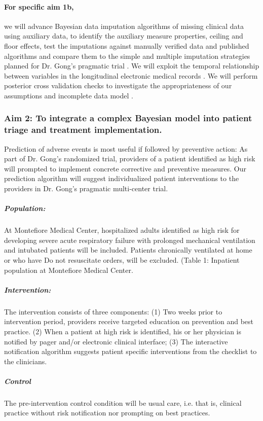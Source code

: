 \documentclass[11pt,notitlepage]{article}
\begin{document}
\paragraph*{For specific aim 1b,}
we will advance Bayesian data imputation algorithms of missing clinical data using auxiliary data, to identify the auxiliary measure properties, ceiling and floor effects, test the imputations against manually verified data and published algorithms and compare them to the simple and multiple imputation strategies planned for Dr. Gong's pragmatic trial \cite{Huntington_16311133,Sloan_15027501}. We will exploit the temporal relationship between variables in the longitudinal electronic medical records \cite{Welch24782349}. We will perform posterior cross validation checks to investigate the appropriateness of our assumptions and incomplete data model \cite{Gelman1998notasked}.


\subsubsection*{Aim 2: To integrate a complex Bayesian model into patient triage and treatment implementation.}
Prediction of adverse events is most useful if followed by preventive action: As part of Dr. Gong's randomized trial, providers of a patient identified as high risk will prompted to implement concrete corrective and preventive measures. Our prediction algorithm will suggest individualized patient interventions to the providers in Dr. Gong's pragmatic multi-center trial. 

\subparagraph*{Population:} 
At Montefiore Medical Center, hospitalized adults identified as high risk for developing severe acute respiratory failure with prolonged mechanical ventilation and intubated patients will be included. Patients chronically ventilated at home or who have Do not resuscitate orders, will be excluded.
(Table 1: Inpatient population at Montefiore Medical Center. 

\subparagraph*{Intervention:}
The intervention consists of three components: (1) Two weeks prior to intervention period, providers receive targeted education on prevention and best practice. (2)  When a patient at high risk is identified, his or her physician is notified by pager and/or electronic clinical interface; (3) The interactive notification algorithm suggests patient specific interventions from the checklist to the clinicians. 

\subparagraph*{Control}
The pre-intervention control condition will be usual care, i.e. that is, clinical practice without risk notification nor prompting on best practices.
\end{document}
